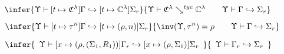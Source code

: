 \begin{figure}
{%
              \begin{equation} 
\infer{\Upsilon\vdash [t\mapsto \mathfrak{C}^\lambda]\Gamma \hookrightarrow [t\mapsto \mathbb{C}^\lambda]\Sigma_r}
{\Upsilon\vdash \mathfrak{C}^\lambda
  \searrow^{tyc} \mathbb{C}^\lambda\qquad \Upsilon\vdash \Gamma \hookrightarrow
  \Sigma_r}
\label{eq:extratypedef}
\end{equation}

\begin{equation} 
\infer{\Upsilon\vdash[t\mapsto\tau^n]\Gamma \hookrightarrow [t\mapsto (\rho, n)]\Sigma_r}
{\inv(\Upsilon,\tau^n)=\rho\qquad\Upsilon\vdash
  \Gamma \hookrightarrow\Sigma_r} 
\label{eq:extraatomictyc}
\end{equation}

\begin{equation}
  \infer{\begin{array}{c}
      \Upsilon\vdash[x\mapsto (\rho, (\Sigma_1,R_1))]\Gamma_r\hookrightarrow [x\mapsto
                (\rho,\Sigma_1)]\Sigma_r
              \end{array}}
              {\begin{array}{c}
                  \Upsilon\vdash\Gamma_r\hookrightarrow \Sigma_r
                \end{array}}
\label{eq:extrastr}
            \end{equation}

}
\end{figure}
